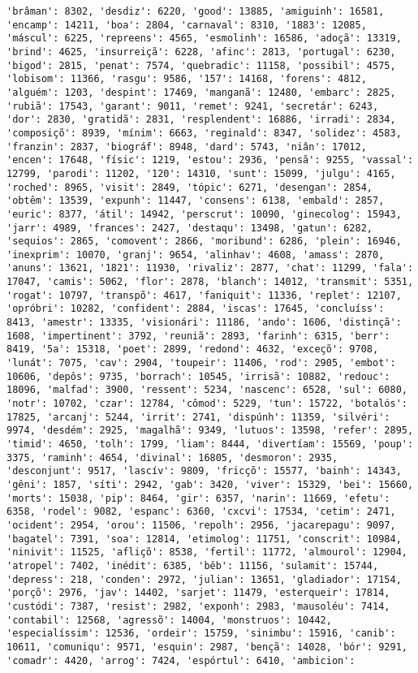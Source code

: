 \documentclass[11pt]{article}
\begin{document}
\begin{Verbatim}[commandchars=\\\{\}]
'brâman': 8302, 'desdiz': 6220, 'good': 13885, 'amiguinh': 16581, 'encamp': 14211, 'boa': 2804, 'carnaval': 8310, '1883': 12085, 'máscul': 6225, 'repreens': 4565, 'esmolinh': 16586, 'adoçã': 13319, 'brind': 4625, 'insurreiçã': 6228, 'afinc': 2813, 'portugal': 6230, 'bigod': 2815, 'penat': 7574, 'quebradic': 11158, 'possibil': 4575, 'lobisom': 11366, 'rasgu': 9586, '157': 14168, 'forens': 4812, 'alguém': 1203, 'despint': 17469, 'manganã': 12480, 'embarc': 2825, 'rubiã': 17543, 'garant': 9011, 'remet': 9241, 'secretár': 6243, 'dor': 2830, 'gratidã': 2831, 'resplendent': 16886, 'irradi': 2834, 'composiçõ': 8939, 'mínim': 6663, 'reginald': 8347, 'solidez': 4583, 'franzin': 2837, 'biográf': 8948, 'dard': 5743, 'niân': 17012, 'encen': 17648, 'físic': 1219, 'estou': 2936, 'pensã': 9255, 'vassal': 12799, 'parodi': 11202, '120': 14310, 'sunt': 15099, 'julgu': 4165, 'roched': 8965, 'visit': 2849, 'tópic': 6271, 'desengan': 2854, 'obtêm': 13539, 'expunh': 11447, 'consens': 6138, 'embald': 2857, 'euric': 8377, 'átil': 14942, 'perscrut': 10090, 'ginecolog': 15943, 'jarr': 4989, 'frances': 2427, 'destaqu': 13498, 'gatun': 6282, 'sequios': 2865, 'comovent': 2866, 'moribund': 6286, 'plein': 16946, 'inexprim': 10070, 'granj': 9654, 'alinhav': 4608, 'amass': 2870, 'anuns': 13621, '1821': 11930, 'rivaliz': 2877, 'chat': 11299, 'fala': 17047, 'camis': 5062, 'flor': 2878, 'blanch': 14012, 'transmit': 5351, 'rogat': 10797, 'transpõ': 4617, 'faniquit': 11336, 'replet': 12107, 'opróbri': 10282, 'confident': 2884, 'iscas': 17645, 'concluíss': 8413, 'amestr': 13335, 'visionári': 11186, 'ando': 1606, 'distinçã': 1608, 'impertinent': 3792, 'reuniã': 2893, 'farinh': 6315, 'berr': 8419, '5a': 15318, 'poet': 2899, 'redond': 4632, 'exceçõ': 9708, 'lunát': 7075, 'cav': 2904, 'toupeir': 11406, 'rod': 2905, 'embot': 10606, 'depôs': 9735, 'borrach': 10545, 'irrisã': 10882, 'redouc': 18096, 'malfad': 3900, 'ressent': 5234, 'nascenc': 6528, 'sul': 6080, 'notr': 10702, 'czar': 12784, 'cômod': 5229, 'tun': 15722, 'botalós': 17825, 'arcanj': 5244, 'irrit': 2741, 'dispúnh': 11359, 'silvéri': 9974, 'desdém': 2925, 'magalhã': 9349, 'lutuos': 13598, 'refer': 2895, 'timid': 4650, 'tolh': 1799, 'liam': 8444, 'divertíam': 15569, 'poup': 3375, 'raminh': 4654, 'divinal': 16805, 'desmoron': 2935, 'desconjunt': 9517, 'lascív': 9809, 'fricçõ': 15577, 'bainh': 14343, 'gêni': 1857, 'síti': 2942, 'gab': 3420, 'viver': 15329, 'bei': 15660, 'morts': 15038, 'pip': 8464, 'gir': 6357, 'narin': 11669, 'efetu': 6358, 'rodel': 9082, 'espanc': 6360, 'cxcvi': 17534, 'cetim': 2471, 'ocident': 2954, 'orou': 11506, 'repolh': 2956, 'jacarepagu': 9097, 'bagatel': 7391, 'soa': 12814, 'etimolog': 11751, 'conscrit': 10984, 'ninivit': 11525, 'afliçõ': 8538, 'fertil': 11772, 'almourol': 12904, 'atropel': 7402, 'inédit': 6385, 'bêb': 11156, 'sulamit': 15744, 'depress': 218, 'conden': 2972, 'julian': 13651, 'gladiador': 17154, 'porçõ': 2976, 'jav': 14402, 'sarjet': 11479, 'esterqueir': 17814, 'custódi': 7387, 'resist': 2982, 'exponh': 2983, 'mausoléu': 7414, 'contabil': 12568, 'agressõ': 14004, 'monstruos': 10442, 'especialíssim': 12536, 'ordeir': 15759, 'sinimbu': 15916, 'canib': 10611, 'comuniqu': 9571, 'esquin': 2987, 'bençã': 14028, 'bór': 9291, 'comadr': 4420, 'arrog': 7424, 'espórtul': 6410, 'ambicion': 
\end{Verbatim}
\end{document}
